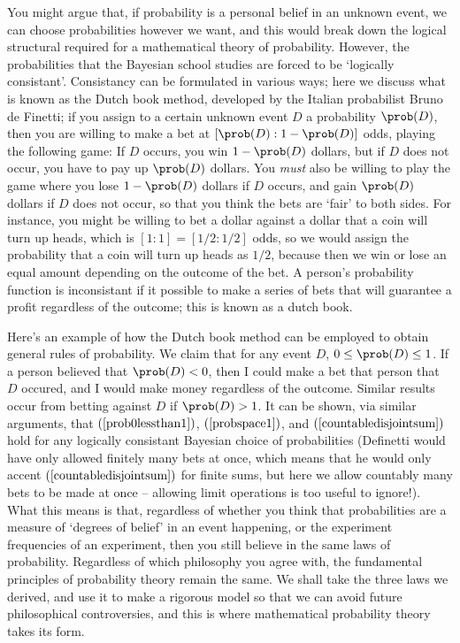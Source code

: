 You might argue that, if probability is a personal belief in an unknown event, we can choose probabilities however we want, and this would break down the logical structural required for a mathematical theory of probability. However, the probabilities that the Bayesian school studies are forced to be `logically consistant'. Consistancy can be formulated in various ways; here we discuss what is known as the Dutch book method, developed by the Italian probabilist Bruno de Finetti; if you assign to a certain unknown event $D$ a probability $\prob(D)$, then you are willing to make a bet at $[\prob(D):1 - \prob(D)]$ odds, playing the following game: If $D$ occurs, you win $1 - \prob(D)$ dollars, but if $D$ does not occur, you have to pay up $\prob(D)$ dollars. You {\it must} also be willing to play the game where you lose $1 - \prob(D)$ dollars if $D$ occurs, and gain $\prob(D)$ dollars if $D$ does not occur, so that you think the bets are `fair' to both sides. For instance, you might be willing to bet a dollar against a dollar that a coin will turn up heads, which is $[1:1] = [1/2:1/2]$ odds, so we would assign the probability that a coin will turn up heads as $1/2$, because then we win or lose an equal amount depending on the outcome of the bet. A person's probability function is inconsistant if it possible to make a series of bets that will guarantee a profit regardless of the outcome; this is known as a dutch book.

Here's an example of how the Dutch book method can be employed to obtain general rules of probability. We claim that for any event $D$, $0 \leq \prob(D) \leq 1$. If a person believed that $\prob(D) < 0$, then I could make a bet that person that $D$ occured, and I would make money regardless of the outcome. Similar results occur from betting against $D$ if $\prob(D) > 1$. It can be shown, via similar arguments, that $(\ref{prob0lessthan1})$, $(\ref{probspace1})$, and $(\ref{countabledisjointsum})$ hold for any logically consistant Bayesian choice of probabilities (Definetti would have only allowed finitely many bets at once, which means that he would only accent $(\ref{countabledisjointsum})$ for finite sums, but here we allow countably many bets to be made at once -- allowing limit operations is too useful to ignore!). What this means is that, regardless of whether you think that probabilities are a measure of `degrees of belief' in an event happening, or the experiment frequencies of an experiment, then you still believe in the same laws of probability. Regardless of which philosophy you agree with, the fundamental principles of probability theory remain the same. We shall take the three laws we derived, and use it to make a rigorous model so that we can avoid future philosophical controversies, and this is where mathematical probability theory takes its form.

